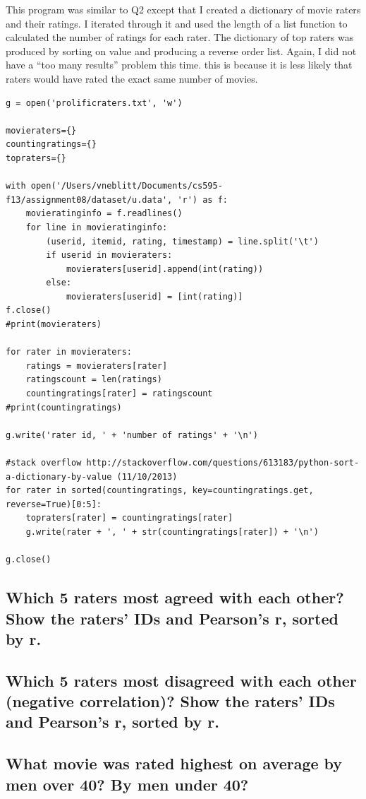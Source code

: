 \documentclass{article}
\begin{document}
This program was similar to Q2 except that I created a dictionary of movie raters and their ratings. I iterated through it and used the length of a list function to calculated the number of ratings for each rater.  The dictionary of top raters was produced by sorting on value and producing a reverse order list. Again, I did not have a ``too many results'' problem this time. this is because it is less likely that raters would have rated the exact same number of movies.


\begin{lstlisting}[frame=single, caption=prolificraters.py, label=prolificraters]
g = open('prolificraters.txt', 'w')

movieraters={}
countingratings={}
topraters={}

with open('/Users/vneblitt/Documents/cs595-f13/assignment08/dataset/u.data', 'r') as f:
	movieratinginfo = f.readlines()
	for line in movieratinginfo:
		(userid, itemid, rating, timestamp) = line.split('\t')
		if userid in movieraters:
			movieraters[userid].append(int(rating))
		else:
			movieraters[userid] = [int(rating)]
f.close()
#print(movieraters)

for rater in movieraters:
	ratings = movieraters[rater]
	ratingscount = len(ratings)
	countingratings[rater] = ratingscount
#print(countingratings)

g.write('rater id, ' + 'number of ratings' + '\n')

#stack overflow http://stackoverflow.com/questions/613183/python-sort-a-dictionary-by-value (11/10/2013)
for rater in sorted(countingratings, key=countingratings.get, reverse=True)[0:5]:
	topraters[rater] = countingratings[rater]
	g.write(rater + ', ' + str(countingratings[rater]) + '\n')

g.close()
\end{lstlisting}

\newpage
\subsection{Which 5 raters most agreed with each other? Show the raters' IDs and Pearson's r, sorted by r.}

\newpage
\subsection{Which 5 raters most disagreed with each other (negative correlation)? Show the raters' IDs and Pearson's r, sorted by r.}

\newpage
\subsection{What movie was rated highest on average by men over 40? By men under 40?}
\end{document}
